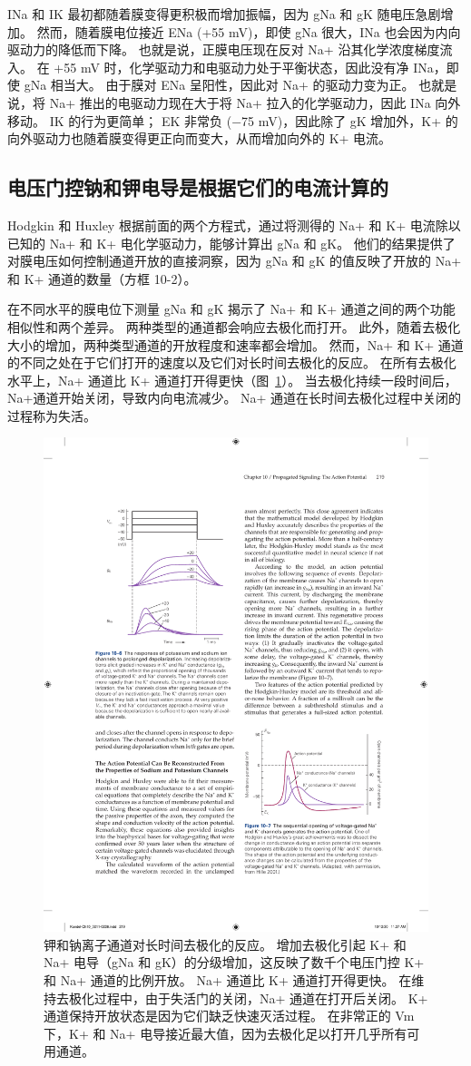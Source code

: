 INa 和 IK 最初都随着膜变得更积极而增加振幅，因为 gNa 和 gK 随电压急剧增加。
然而，随着膜电位接近 ENa (+55 mV)，即使 gNa 很大，INa 也会因为内向驱动力的降低而下降。
也就是说，正膜电压现在反对 Na+ 沿其化学浓度梯度流入。
在 +55 mV 时，化学驱动力和电驱动力处于平衡状态，因此没有净 INa，即使 gNa 相当大。
由于膜对 ENa 呈阳性，因此对 Na+ 的驱动力变为正。 
也就是说，将 Na+ 推出的电驱动力现在大于将 Na+ 拉入的化学驱动力，因此 INa 向外移动。
IK 的行为更简单； EK 非常负 (−75 mV)，因此除了 gK 增加外，K+ 的向外驱动力也随着膜变得更正向而变大，从而增加向外的 K+ 电流。



\subsection{电压门控钠和钾电导是根据它们的电流计算的}

Hodgkin 和 Huxley 根据前面的两个方程式，通过将测得的 Na+ 和 K+ 电流除以已知的 Na+ 和 K+ 电化学驱动力，能够计算出 gNa 和 gK。
他们的结果提供了对膜电压如何控制通道开放的直接洞察，因为 gNa 和 gK 的值反映了开放的 Na+ 和 K+ 通道的数量（方框 10-2）。


在不同水平的膜电位下测量 gNa 和 gK 揭示了 Na+ 和 K+ 通道之间的两个功能相似性和两个差异。
两种类型的通道都会响应去极化而打开。
此外，随着去极化大小的增加，两种类型通道的开放程度和速率都会增加。
然而，Na+ 和 K+ 通道的不同之处在于它们打开的速度以及它们对长时间去极化的反应。
在所有去极化水平上，Na+ 通道比 K+ 通道打开得更快（图~\ref{fig:10_6}）。 
当去极化持续一段时间后，Na+通道开始关闭，导致内向电流减少。
Na+ 通道在长时间去极化过程中关闭的过程称为失活。


\begin{figure}[htbp]
	\centering
	\includegraphics[width=0.5\linewidth]{chap10/fig_10_6}
	\caption{钾和钠离子通道对长时间去极化的反应。 增加去极化引起 K+ 和 Na+ 电导（gNa 和 gK）的分级增加，这反映了数千个电压门控 K+ 和 Na+ 通道的比例开放。 Na+ 通道比 K+ 通道打开得更快。 在维持去极化过程中，由于失活门的关闭，Na+ 通道在打开后关闭。 K+ 通道保持开放状态是因为它们缺乏快速灭活过程。 在非常正的 Vm 下，K+ 和 Na+ 电导接近最大值，因为去极化足以打开几乎所有可用通道。}
	\label{fig:10_6}
\end{figure}


